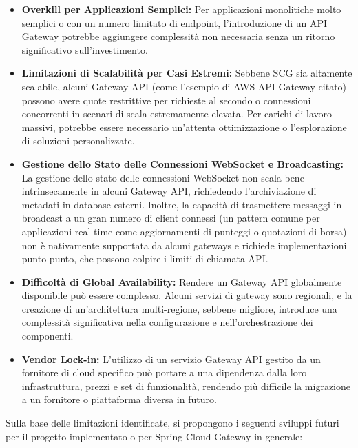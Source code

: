 \begin{itemize}
    \item \textbf{Overkill per Applicazioni Semplici:} Per applicazioni monolitiche molto semplici o con un numero limitato di endpoint, l'introduzione di un API Gateway potrebbe aggiungere complessità non necessaria senza un ritorno significativo sull'investimento.
    \item \textbf{Limitazioni di Scalabilità per Casi Estremi:} Sebbene SCG sia altamente scalabile, alcuni Gateway API (come l'esempio di AWS API Gateway citato) possono avere quote restrittive per richieste al secondo o connessioni concorrenti in scenari di scala estremamente elevata. Per carichi di lavoro massivi, potrebbe essere necessario un'attenta ottimizzazione o l'esplorazione di soluzioni personalizzate.
    \item \textbf{Gestione dello Stato delle Connessioni WebSocket e Broadcasting:} La gestione dello stato delle connessioni WebSocket non scala bene intrinsecamente in alcuni Gateway API, richiedendo l'archiviazione di metadati in database esterni. Inoltre, la capacità di trasmettere messaggi in broadcast a un gran numero di client connessi (un pattern comune per applicazioni real-time come aggiornamenti di punteggi o quotazioni di borsa) non è nativamente supportata da alcuni gateways e richiede implementazioni punto-punto, che possono colpire i limiti di chiamata API.
    \item \textbf{Difficoltà di Global Availability:} Rendere un Gateway API globalmente disponibile può essere complesso. Alcuni servizi di gateway sono regionali, e la creazione di un'architettura multi-regione, sebbene migliore, introduce una complessità significativa nella configurazione e nell'orchestrazione dei componenti.
    \item \textbf{Vendor Lock-in:} L'utilizzo di un servizio Gateway API gestito da un fornitore di cloud specifico può portare a una dipendenza dalla loro infrastruttura, prezzi e set di funzionalità, rendendo più difficile la migrazione a un fornitore o piattaforma diversa in futuro.
\end{itemize}

Sulla base delle limitazioni identificate, si propongono i seguenti sviluppi futuri per il progetto implementato o per Spring Cloud Gateway in generale:

